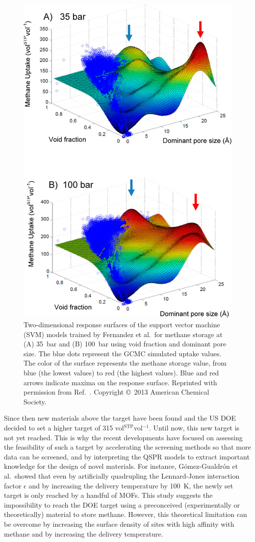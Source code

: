 \documentclass[main.tex]{subfiles}
\begin{document}
\begin{figure}[ht]
\centering
  \includegraphics[width=0.5\linewidth]{figures/1-screening/Fernandez_2013_feature.jpeg}
  \caption{Two-dimensional response surfaces of the support vector machine (SVM) models trained by Fernandez et al.\ for methane storage at (A) 35~bar and (B) 100~bar using void fraction and dominant pore size. The blue dots represent the GCMC simulated uptake values. The color of the surface represents the methane storage value, from blue (the lowest values) to red (the highest values). Blue and red arrows indicate maxima on the response surface. Reprinted with permission from Ref.~\cite{Fernandez_2013}. Copyright \copyright\  2013 American Chemical Society.}\label{fgr:Fernandez_2013}
\end{figure}

Since then new materials above the target have been found and the US DOE decided to set a higher target of 315 vol{\footnotesize$^\mathrm{STP}$}vol$^{-1}$. Until now, this new target is not yet reached. This is why the recent developments have focused on assessing the feasibility of such a target by accelerating the screening methods so that more data can be screened, and by interpreting the QSPR models to extract important knowledge for the design of novel materials. For instance, G{\'{o}}mez-Gualdr{\'{o}}n et al.\ showed that even by artificially quadrupling the Lennard-Jones interaction factor $\epsilon$ and by increasing the delivery temperature by \SI{100}{\kelvin}, the newly set target is only reached by a handful of MOFs.\autocite{Gomez_Gualdron_2014} This study suggests the impossibility to reach the DOE target using a preconceived (experimentally or theoretically) material to store methane. However, this theoretical limitation can be overcome by increasing the surface density of sites with high affinity with methane and by increasing the delivery temperature.
\end{document}

